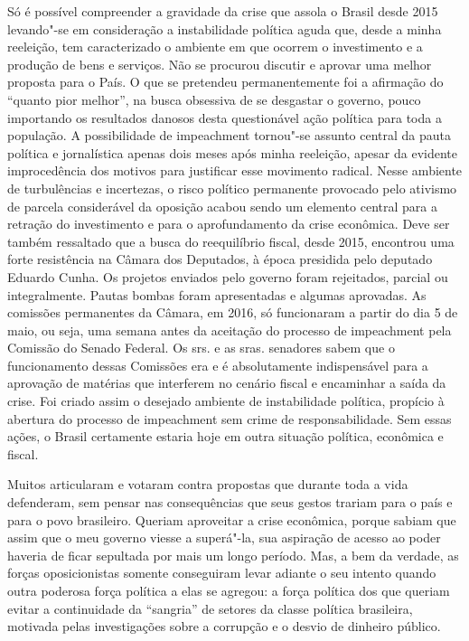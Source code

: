 Só é possível compreender a gravidade da crise que assola o Brasil desde
2015 levando"-se em consideração a instabilidade política aguda que,
desde a minha reeleição, tem caracterizado o ambiente em que ocorrem o
investimento e a produção de bens e serviços. Não se procurou discutir e
aprovar uma melhor proposta para o País. O que se pretendeu
permanentemente foi a afirmação do ``quanto pior melhor'', na busca
obsessiva de se desgastar o governo, pouco importando os resultados
danosos desta questionável ação política para toda a população. A
possibilidade de impeachment tornou"-se assunto central da pauta política
e jornalística apenas dois meses após minha reeleição, apesar da
evidente improcedência dos motivos para justificar esse movimento
radical. Nesse ambiente de turbulências e incertezas, o risco político
permanente provocado pelo ativismo de parcela considerável da oposição
acabou sendo um elemento central para a retração do investimento e para
o aprofundamento da crise econômica. Deve ser também ressaltado que a
busca do reequilíbrio fiscal, desde 2015, encontrou uma forte
resistência na Câmara dos Deputados, à época presidida pelo deputado
Eduardo Cunha. Os projetos enviados pelo governo foram rejeitados,
parcial ou integralmente. Pautas bombas foram apresentadas e algumas
aprovadas. As comissões permanentes da Câmara, em 2016, só funcionaram a
partir do dia 5 de maio, ou seja, uma semana antes da aceitação do
processo de impeachment pela Comissão do Senado Federal. Os srs. e as
sras. senadores sabem que o funcionamento dessas Comissões era e é
absolutamente indispensável para a aprovação de matérias que interferem
no cenário fiscal e encaminhar a saída da crise. Foi criado assim o
desejado ambiente de instabilidade política, propício à abertura do
processo de impeachment sem crime de responsabilidade. Sem essas ações,
o Brasil certamente estaria hoje em outra situação política, econômica e
fiscal.

Muitos articularam e votaram contra propostas que durante toda a vida
defenderam, sem pensar nas consequências que seus gestos trariam para o
país e para o povo brasileiro. Queriam aproveitar a crise econômica,
porque sabiam que assim que o meu governo viesse a superá"-la, sua
aspiração de acesso ao poder haveria de ficar sepultada por mais um
longo período. Mas, a bem da verdade, as forças oposicionistas somente
conseguiram levar adiante o seu intento quando outra poderosa força
política a elas se agregou: a força política dos que queriam evitar a
continuidade da ``sangria'' de setores da classe política brasileira,
motivada pelas investigações sobre a corrupção e o desvio de dinheiro
público.

